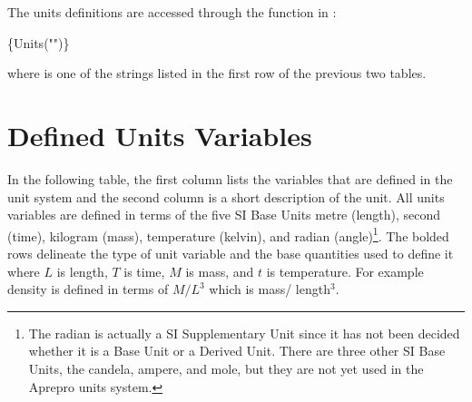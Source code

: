 The units definitions are accessed through the  function in \aprepro{}:
\begin{apinp}
\{Units("")\}
\end{apinp}
where  is one of the strings listed in the first row
of the previous two tables.

\section{Defined Units Variables}

In the following table, the first column lists the variables
that are defined in the \aprepro{} unit system and the second column
is a short description of the unit. All units variables are defined in
terms of the five SI Base Units metre (length), second (time),
kilogram (mass), temperature (kelvin), and radian (angle)\footnote{The
radian is actually a SI Supplementary Unit since it has not been
decided whether it is a Base Unit or a Derived Unit. There are three
other SI Base Units, the candela, ampere, and mole, but they are not
yet used in the Aprepro units system.}. The bolded rows
delineate the type of unit variable and the base quantities used to
define it where $L$ is length, $T$ is time, $M$ is mass, and $t$ is
temperature. For example density is defined in terms of $M/L^3$ which
is mass/ length$^3$.

